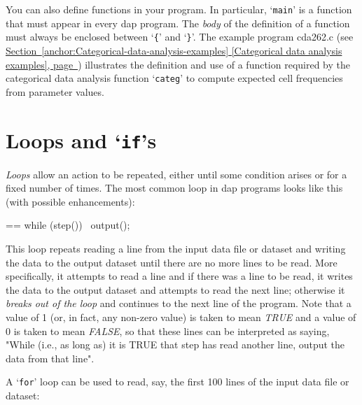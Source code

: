 \documentclass{book}
\makeatletter
\newenvironment{Texinfopreformatted}{%
  \par\GNUTobeylines\obeyspaces\frenchspacing\parskip=\z@\parindent=\z@}{}
{\catcode`\^^M=13 \gdef\GNUTobeylines{\catcode`\^^M=13 \def^^M{\null\par}}}
\newenvironment{Texinfoindented}{\begin{list}{}{}\item\relax}{\end{list}}
\renewcommand{\_}{\Texinfounderscore\discretionary{}{}{}}
\makeatother
\begin{document}
You can also define functions in your program.  In particular, `\texttt{main}'
%
is a function that must appear in every dap program.  The \textsl{body} of
the definition of a function must always be enclosed between `\texttt{\{}'
and `\texttt{\}}'.
The example program cda262.c (see \hyperref[anchor:Categorical-data-analysis-examples]{Section~\ref*{anchor:Categorical-data-analysis-examples} [Categorical data analysis examples], page~\pageref*{anchor:Categorical-data-analysis-examples}})
illustrates the definition and use of a function required by
the categorical data analysis function `\texttt{categ}'
to compute expected cell frequencies from parameter values.

\section{{Loops and `\texttt{if}'s}}
\label{anchor:Loops-and-ifs}%

\textsl{Loops} allow an action to be repeated, either until some condition
arises or for a fixed number of times.  The most common loop in dap
programs looks like this (with possible enhancements):

\begin{Texinfoindented}
\begin{Texinfopreformatted}%
\ttfamily while (step())
\  output();
\end{Texinfopreformatted}
\end{Texinfoindented}
\noindent{}This loop repeats reading a line from the input data file or dataset
and writing the data to the output dataset until
there are no more lines to be read.
More specifically, it attempts to read a line and
if there was a line to be read, it writes the data to the output dataset and
attempts to read the next line; otherwise it
\textsl{breaks out of the loop} and continues to the next line of the program.
Note that a value of 1 (or, in fact, any non-zero value) is taken to mean
\textsl{TRUE} and a value of 0 is taken to mean \textsl{FALSE}, so that these lines
can be interpreted as saying, "While (i.e., as long as)
it is TRUE that step has read another
line, output the data from that line".

A `\texttt{for}' loop can be used
to read, say, the first 100 lines of the input data file or dataset:
\end{document}
